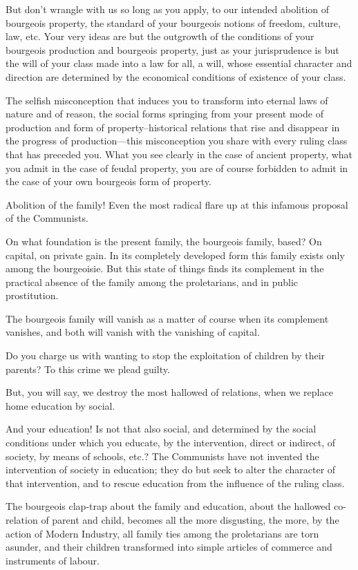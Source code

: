 \documentclass[, oneside]{article}   	%
\begin{document}
But don't wrangle with us so long as you apply, to our intended abolition of bourgeois property, the standard of your bourgeois notions of freedom, culture, law, etc. Your very ideas are but the outgrowth of the conditions of your bourgeois production and bourgeois property, just as your jurisprudence is but the will of your class made into a law for all, a will, whose essential character and direction are determined by the economical conditions of existence of your class.

The selfish misconception that induces you to transform into eternal laws of nature and of reason, the social forms springing from your present mode of production and form of property--historical relations that rise and disappear in the progress of production—this misconception you share with every ruling class that has preceded you. What you see clearly in the case of ancient property, what you admit in the case of feudal property, you are of course forbidden to admit in the case of your own bourgeois form of property.

Abolition of the family! Even the most radical flare up at this infamous proposal of the Communists.

On what foundation is the present family, the bourgeois family, based? On capital, on private gain. In its completely developed form this family exists only among the bourgeoisie. But this state of things finds its complement in the practical absence of the family among the proletarians, and in public prostitution.

The bourgeois family will vanish as a matter of course when its complement vanishes, and both will vanish with the vanishing of capital.

Do you charge us with wanting to stop the exploitation of children by their parents? To this crime we plead guilty.

But, you will say, we destroy the most hallowed of relations, when we replace home education by social.

And your education! Is not that also social, and determined by the social conditions under which you educate, by the intervention, direct or indirect, of society, by means of schools, etc.? The Communists have not invented the intervention of society in education; they do but seek to alter the character of that intervention, and to rescue education from the influence of the ruling class.

The bourgeois clap-trap about the family and education, about the hallowed co-relation of parent and child, becomes all the more disgusting, the more, by the action of Modern Industry, all family ties among the proletarians are torn asunder, and their children transformed into simple articles of commerce and instruments of labour.
\end{document}
